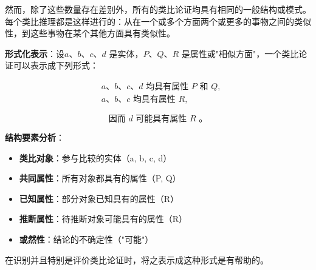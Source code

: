 \begin{theorembox}[title=类比论证的一般结构]
然而，除了这些数量存在差别外，所有的类比论证均具有相同的一般结构或模式。每个类比推理都是这样进行的：从在一个或多个方面两个或更多的事物之间的类似性，到这些事物在某个其他方面具有类似性。

\textbf{形式化表示}：设$a 、 b 、 c 、 d$ 是实体，$P 、 Q 、 R$ 是属性或"相似方面"，一个类比论证可以表示成下列形式：

$$
\begin{aligned}
& a 、 b 、 c 、 d \text { 均具有属性 } P \text { 和 } Q, \\
& a 、 b 、 c \text { 均具有属性 } R,
\end{aligned}
$$

$$
\text { 因而 } d \text { 可能具有属性 } R \text { 。 }
$$

\textbf{结构要素分析}：
\begin{itemize}
\item \textbf{类比对象}：参与比较的实体（a, b, c, d）
\item \textbf{共同属性}：所有对象都具有的属性（P, Q）
\item \textbf{已知属性}：部分对象已知具有的属性（R）
\item \textbf{推断属性}：待推断对象可能具有的属性（R）
\item \textbf{或然性}：结论的不确定性（"可能"）
\end{itemize}

在识别并且特别是评价类比论证时，将之表示成这种形式是有帮助的。
\end{theorembox}

